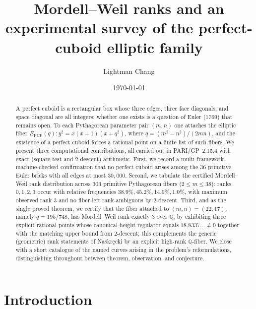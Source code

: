 \documentclass[11pt,reqno]{amsart}
\theoremstyle{plain}
\theoremstyle{definition}
\theoremstyle{remark}
\newcommand{\Q}{\mathbb{Q}}
\newcommand{\PCP}{E_{\mathrm{PCP}}}
\begin{document}
\title[Mordell--Weil ranks and a survey of the perfect-cuboid elliptic family]{Mordell--Weil ranks and an experimental survey of the
perfect-cuboid elliptic family}

\author{Lightman Chang}
\address{Independent Researcher}


\date{\today}

\begin{abstract}
A perfect cuboid is a rectangular box whose three edges, three face diagonals,
and space diagonal are all integers; whether one exists is a question of Euler
(1769) that remains open. To each Pythagorean parameter pair $(m,n)$ one
attaches the elliptic fiber $\PCP(q)\colon y^2=x(x+1)(x+q^2)$, where
$q=(m^2-n^2)/(2mn)$, and the existence of a perfect cuboid forces a rational
point on a finite list of such fibers. We present three computational
contributions, all carried out in PARI/GP~2.15.4 with exact (square-test and
$2$-descent) arithmetic. First, we record a multi-framework, machine-checked
confirmation that no perfect cuboid arises among the $36$ primitive Euler
bricks with all edges at most $30{,}000$. Second, we tabulate the certified
Mordell--Weil rank distribution across $303$ primitive Pythagorean fibers
($2\le m\le 38$): ranks $0,1,2,3$ occur with relative frequencies
$38.9\%,45.2\%,14.9\%,1.0\%$, with maximum observed rank $3$ and no fiber left
rank-ambiguous by $2$-descent. Third, and as the single proved theorem, we
certify that the fiber attached to $(m,n)=(22,17)$, namely $q=195/748$, has
Mordell--Weil rank exactly $3$ over $\Q$, by exhibiting three explicit rational
points whose canonical-height regulator equals $18.8337\ldots\neq 0$ together
with the matching upper bound from $2$-descent; this complements the generic
(geometric) rank statements of Naskr\k{e}cki by an explicit high-rank
$\Q$-fiber. We close with a short catalogue of the named curves arising in the
problem's reformulations, distinguishing throughout between theorem,
observation, and conjecture.
\end{abstract}

\maketitle

\section{Introduction}\label{sec:intro}
\end{document}
